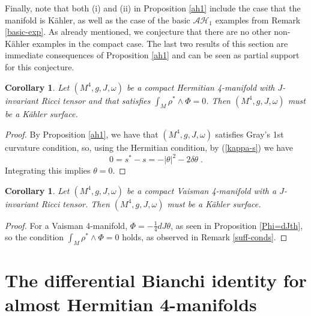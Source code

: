 \documentclass{amsart}
\newtheorem{cor}[theorem]{Corollary}
\begin{document}
\noindent
Finally, note that both (i) and (ii) in Proposition \ref{ah1} include the case that the manifold is K\"ahler, as well as the case of the basic $\mathcal{AH}_1$ examples from Remark \ref{basic-exp}. As already mentioned, we conjecture that there are no other non-K\"ahler examples in the compact case. The last two results of this section are immediate consequences of Proposition \ref{ah1} and can be seen as partial support for this conjecture.


\begin{cor} \label{herm-case}
Let $(M^4, g, J, \omega)$ be a compact Hermitian 4-manifold with $J$-invariant Ricci tensor and that satisfies $\displaystyle{\int_M \rho^* \wedge \Phi = 0}$. Then $(M^4, g, J, \omega)$ must be a K\"ahler surface.
\end{cor}
\begin{proof} By Proposition \ref{ah1}, we have that $(M^4, g, J, \omega)$ satisfies Gray's 1st curvature condition, so, using the Hermitian condition, by (\ref{kappa-s}) we have
$$ 0 = s^* - s = -|\theta|^2 -2\delta \theta  \; .$$
Integrating this implies $\theta = 0$.
\end{proof} 

\begin{cor}
Let $(M^4, g, J, \omega)$ be a compact Vaisman 4-manifold with a $J$-invariant Ricci tensor. Then $(M^4, g, J, \omega)$ must be a K\"ahler surface.
\end{cor}
\begin{proof}
For a Vaisman 4-manifold, $\Phi = - \frac{1}{4} dJ\theta$, as seen in Proposition \ref{Phi=dJth}, so the condition
$\displaystyle{\int_M \rho^* \wedge \Phi = 0}$ holds, as observed in Remark \ref{suff-conds}.
\end{proof}






\section{The differential Bianchi identity for almost Hermitian 4-manifolds} 
\end{document}
